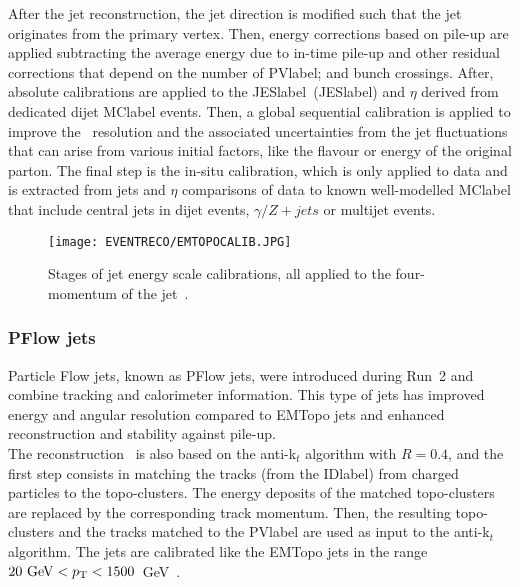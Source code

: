 After the jet reconstruction, the jet direction is modified such that the jet originates from the primary vertex. Then, energy corrections based on pile-up are applied subtracting the average energy due to in-time pile-up and other residual corrections that depend on the number of \acrshort{PVlabel}; and bunch crossings. After, absolute calibrations are applied to the \acrlong{JESlabel}~(\acrshort{JESlabel}) and $\eta$ derived from dedicated dijet \acrshort{MClabel} events. Then, a global sequential calibration is applied to improve the \pT\ resolution and the associated uncertainties from the jet fluctuations that can arise from various initial factors, like the flavour or energy of the original parton. The final step is the in-situ calibration, which is only applied to data and is extracted from jets \pT and $\eta$ comparisons of data to known well-modelled \acrshort{MClabel} that include central jets in dijet events, $\gamma/Z+jets$ or multijet events.\\

\begin{figure}[htbp]
    \RawFloats
    \begin{center}
    \texttt{[image: EVENTRECO/EMTOPOCALIB.JPG]}
    \caption{
        Stages of jet energy scale calibrations, all applied to the four-momentum of the jet~\cite{2007.02645}. 
    }
    \label{figEVNTRECO:EMTOPO}
    \end{center}
\end{figure}
\subsubsection{PFlow jets}

Particle Flow jets, known as PFlow jets, were introduced during Run~2 and combine tracking and calorimeter information. This type of jets has improved energy and angular resolution compared to EMTopo jets and enhanced reconstruction and stability against pile-up.\\

The reconstruction~\cite{pflow} is also based on the anti-k$_t$ algorithm with $R=0.4$, and the first step consists in matching the tracks (from the \acrshort{IDlabel}) from charged particles to the topo-clusters. The energy deposits of the matched topo-clusters are replaced by the corresponding track momentum. Then, the resulting topo-clusters and the tracks matched to the \acrshort{PVlabel} are used as input to the anti-k$_t$ algorithm. The jets are calibrated like the EMTopo jets in the range $20\text{ GeV}<p_{\text{T}}<1500$~GeV~\cite{ATLAS_Collaboration2020-ip}. 

